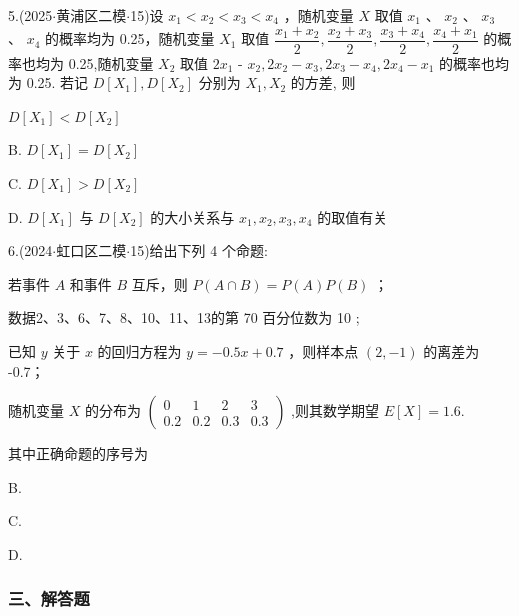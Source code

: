 5.(2025$\cdot$黄浦区二模$\cdot$15)设 ${x}_{1} < {x}_{2} < {x}_{3} < {x}_{4}$ ，随机变量 $X$ 取值 ${x}_{1}$ 、 ${x}_{2}$ 、 ${x}_{3}$ 、 ${x}_{4}$ 的概率均为 0.25，随机变量 ${X}_{1}$ 取值 $\dfrac{{x}_{1} + {x}_{2}}{2},\dfrac{{x}_{2} + {x}_{3}}{2},\dfrac{{x}_{3} + {x}_{4}}{2},\dfrac{{x}_{4} + {x}_{1}}{2}$ 的概率也均为 0.25,随机变量 ${X}_{2}$ 取值 $2{x}_{1}$ - ${x}_{2},2{x}_{2} - {x}_{3},2{x}_{3} - {x}_{4},2{x}_{4} - {x}_{1}$ 的概率也均为 0.25. 若记 $D\left\lbrack  {X}_{1}\right\rbrack  ,D\left\lbrack  {X}_{2}\right\rbrack$ 分别为 ${X}_{1},{X}_{2}$ 的方差, 则 \dotfill{(\kh{})}

\xx{}{}{}{}$D\left\lbrack  {X}_{1}\right\rbrack   < D\left\lbrack  {X}_{2}\right\rbrack$

B. $D\left\lbrack  {X}_{1}\right\rbrack   = D\left\lbrack  {X}_{2}\right\rbrack$

C. $D\left\lbrack  {X}_{1}\right\rbrack   > D\left\lbrack  {X}_{2}\right\rbrack$

D. $D\left\lbrack  {X}_{1}\right\rbrack$ 与 $D\left\lbrack  {X}_{2}\right\rbrack$ 的大小关系与 ${x}_{1},{x}_{2},{x}_{3},{x}_{4}$ 的取值有关

6.(2024$\cdot$虹口区二模$\cdot$15)给出下列 4 个命题:

   若事件 $A$ 和事件 $B$ 互斥，则 $P\left( {A \cap  B}\right)  = P\left( A\right) P\left( B\right)$ ；

   数据2、3、6、7、8、10、11、13的第 70 百分位数为 10 ;

  已知 $y$ 关于 $x$ 的回归方程为 $y =  - {0.5x} + {0.7}$ ，则样本点 $\left( {2, - 1}\right)$ 的离差为 -0.7；

   随机变量 $X$ 的分布为 $\left( \begin{matrix} 0 & 1 & 2 & 3 \\  {0.2} & {0.2} & {0.3} & {0.3} \end{matrix}\right)$ ,则其数学期望 $E\left\lbrack  X\right\rbrack   = {1.6}$.

其中正确命题的序号为 \dotfill{(\kh{})}

\xx{}{}{}{}    

B.     

C.     

D.     

\subsubsection*{三、解答题}

